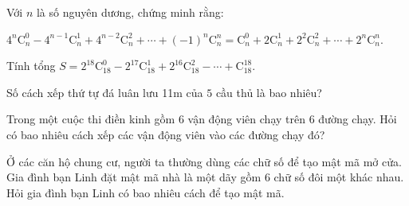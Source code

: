 \begin{vd}%
	Với $n$ là số nguyên dương, chứng minh rằng:\begin{center}
		$4^n\mathrm{C}_n^0-4^{n-1}\mathrm{C}_n^1+4^{n-2}\mathrm{C}_n^2+\cdots+(-1)^n\mathrm{C}_n^n=\mathrm{C}_n^0+2\mathrm{C}_n^1+2^2\mathrm{C}_n^2+\cdots+2^n\mathrm{C}_n^n$.
	\end{center}
\end{vd}

\begin{vd}%
	Tính tổng $S=2^{18}\mathrm{C}_{18}^0-2^{17}\mathrm{C}_{18}^1+2^{16}\mathrm{C}_{18}^2-\cdots+\mathrm{C}_{18}^{18}$.
\end{vd}

\begin{vd}%
	Số cách xếp thứ tự đá luân lưu 11m của $5$ cầu thủ là bao nhiêu?
\end{vd}

\begin{vd}%
	Trong một cuộc thi điền kinh gồm $6$ vận động viên chạy trên $6$ đường chạy. Hỏi có bao nhiêu cách xếp các vận động viên vào các đường chạy đó?
\end{vd}

\begin{vd}%
	Ở các căn hộ chung cư, người ta thường dùng các chữ số để tạo mật mã mở cửa. Gia đình bạn Linh đặt mật mã nhà là một dãy gồm $6$ chữ số đôi một khác nhau. Hỏi gia đình bạn Linh có bao nhiêu cách để tạo mật mã.
\end{vd}

